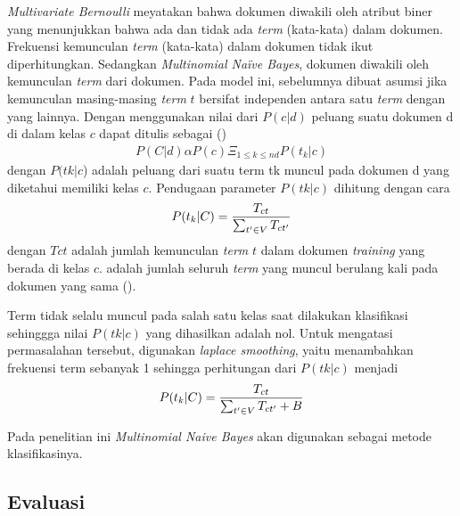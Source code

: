 \textit{Multivariate Bernoulli} meyatakan bahwa dokumen diwakili oleh atribut biner yang menunjukkan bahwa ada dan tidak ada \textit{term} (kata-kata) dalam dokumen. Frekuensi kemunculan \textit{term} (kata-kata) dalam dokumen tidak ikut diperhitungkan.  
Sedangkan \textit{Multinomial Naïve Bayes}, dokumen diwakili oleh kemunculan \textit{term} dari dokumen. Pada model ini, sebelumnya dibuat asumsi jika kemunculan masing-masing \textit{term} $t$ bersifat independen antara satu \textit{term} dengan yang lainnya. Dengan menggunakan nilai dari $P(c|d)$ peluang suatu dokumen d di dalam kelas $c$ dapat ditulis sebagai (\cite{MANNING2008})
\begin{equation}
\begin{split}
P(C|d) \alpha P(c) \Xi_{1\le k\le nd}P(t_k|c)
\label{eq:multinb}
\end{split}
\end{equation}
dengan $P(tk|c$) adalah peluang dari suatu term tk muncul pada dokumen d yang diketahui memiliki kelas $c$. Pendugaan parameter $P(tk|c)$ dihitung dengan cara
\begin{equation}
\begin{split}
\tiny
P(t_k|C) = \frac{T_{ct}}{\sum _{t' \in V} T_{ct'}}
\label{eq:multinblanjut}
\normalsize
\end{split}
\end{equation}
dengan $Tct$ adalah jumlah kemunculan \textit{term} $t$ dalam dokumen \textit{training} yang berada di kelas $c$.  adalah jumlah seluruh \textit{term} yang muncul berulang kali pada dokumen yang sama (\cite{MANNING2008}).

Term tidak selalu muncul pada salah satu kelas saat dilakukan \newline klasifikasi sehinggga nilai $P(tk|c)$ yang dihasilkan adalah nol. Untuk mengatasi permasalahan tersebut, digunakan \textit{laplace smoothing}, yaitu menambahkan frekuensi term sebanyak 1 sehingga perhitungan dari $P(tk|c)$ menjadi
\begin{equation}
\begin{split}
\tiny
P(t_k|C) = \frac{T_{ct}}{\sum _{t' \in V} T_{ct'} + B}
\label{eq:multinblanjutb}
\normalsize
\end{split}
\end{equation}

Pada penelitian ini \textit{Multinomial Naive Bayes} akan digunakan sebagai metode klasifikasinya.

\subsection*{Evaluasi}

